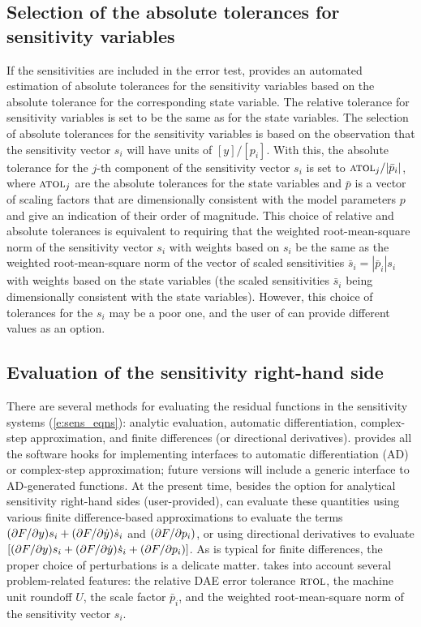 \subsection{Selection of the absolute tolerances for sensitivity variables}
If the sensitivities are included in the error
test, {\idas} provides an
automated estimation of absolute tolerances for the sensitivity variables 
based on the absolute tolerance for the corresponding state variable.
The relative tolerance for sensitivity variables is set to be the same as for 
the state variables. The selection of absolute tolerances for the sensitivity 
variables is based on the observation that the sensitivity vector $s_i$ will have 
units of $[y]/[p_i]$.
With this, the absolute tolerance for the $j$-th component of the sensitivity
vector $s_i$ is set to ${\mbox{\sc atol}_j}/{|{\bar p}_i|}$, where
$\mbox{\sc atol}_j$ are the absolute tolerances for the state variables and $\bar p$
is a vector of scaling factors that are dimensionally consistent with
the model parameters $p$ and give an indication of their order of magnitude.
This choice of relative and absolute tolerances is equivalent 
to requiring that the weighted root-mean-square norm of the sensitivity 
vector $s_i$ with weights based on $s_i$ be the same as the
weighted root-mean-square norm of the vector of scaled sensitivities 
${\bar s}_i = |{\bar p}_i| s_i$ with weights based on the state variables
(the scaled sensitivities ${\bar s}_i$ being dimensionally consistent with the
state variables).
%
However, this choice of tolerances for the $s_i$ may be a poor one, and the user 
of {\idas} can provide different values as an option.

\subsection{Evaluation of the sensitivity right-hand side}
There are several methods for evaluating the residual functions in the sensitivity 
systems (\ref{e:sens_eqns}): analytic evaluation, automatic differentiation, 
complex-step approximation, and finite differences (or directional derivatives).
{\idas} provides all the software hooks for implementing interfaces to
automatic differentiation (AD) or complex-step approximation; future versions
will include a generic interface to AD-generated functions.
At the present time, besides the option for analytical sensitivity right-hand 
sides (user-provided), {\idas} can evaluate these quantities using various finite
difference-based approximations to evaluate the terms $(\partial F / \partial y) s_i + (\partial F / \partial \dot y) \dot s_i$ 
and $(\partial F / \partial p_i)$, or using directional derivatives to evaluate
$\left[ (\partial F / \partial y) s_i + (\partial F / \partial \dot y) \dot s_i + (\partial F / \partial p_i) \right]$.
As is typical for finite differences, the proper choice of perturbations is a 
delicate matter. {\idas} takes into account several problem-related features:
the relative DAE error tolerance $\mbox{\sc rtol}$, the machine unit roundoff $U$,
the scale factor ${\bar p}_i$, and the weighted root-mean-square norm of the 
sensitivity vector $s_i$.


